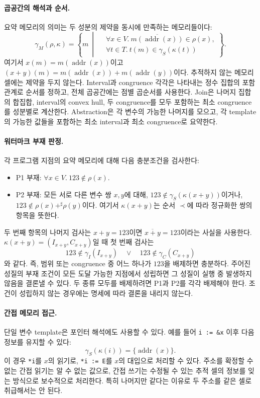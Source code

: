 \documentclass[a4paper,10pt]{article}
\newcommand{\addr}{\operatorname{addr}}
\newcommand{\remN}[1]{\overline{#1}}
\begin{document}
\paragraph{곱공간의 해석과 순서.}
요약 메모리의 의미는 두 성분의 제약을 동시에 만족하는 메모리들이다:
\[
 \gamma_M(\rho,\kappa)=
 \left\{m\ \middle|\
 \begin{aligned}
  &\forall x\in V.\ \remN{m(\addr(x))}\in\rho(x),\\
  &\forall t\in T.\ t(m)\in\gamma_S(\kappa(t))
 \end{aligned}
 \right\}.
\]
여기서 $x(m)=m(\addr(x))$이고
$(x+y)(m)=m(\addr(x))+m(\addr(y))$이다.
추적하지 않는 메모리 셀에는 제약을 두지 않는다.
Interval과 congruence 각각은 나타내는 정수 집합의 포함관계로 순서를 정하고,
전체 곱공간에는 점별 곱순서를 사용한다.
Join은 나머지 집합의 합집합, interval의 convex hull,
두 congruence를 모두 포함하는 최소 congruence를 성분별로 계산한다.
Abstraction은 각 변수의 가능한 나머지를 모으고,
각 template의 가능한 값들을 포함하는 최소 interval과 최소 congruence로 요약한다.

\paragraph{워터마크 부재 판정.}
각 프로그램 지점의 요약 메모리에 대해 다음 충분조건을 검사한다:
\begin{itemize}[leftmargin=*,itemsep=3pt]
 \item P1 부재:
 $\forall x\in V.\ 123\notin\rho(x)$.
 \item P2 부재: 모든 서로 다른 변수 쌍 $x,y$에 대해,
 $123\notin\gamma_S(\kappa(x+y))$이거나,
 $123\notin\rho(x)+^\sharp\rho(y)$이다.
 여기서 $\kappa(x+y)$는 순서 $\prec$에 따라 정규화한 쌍의 항목을 뜻한다.
\end{itemize}
두 번째 항목의 나머지 검사는 $x+y=123$이면
$\remN{x+y}=123$이라는 사실을 사용한다.
$\kappa(x+y)=(I_{x+y},C_{x+y})$일 때 첫 번째 검사는
\[
 123\notin\gamma_I(I_{x+y})
 \quad\lor\quad
 123\notin\gamma_C(C_{x+y})
\]
와 같다. 즉, 범위 또는 congruence 중 어느 하나가 $123$을 배제하면 충분하다.
주어진 성질의 부재 조건이 모든 도달 가능한 지점에서 성립하면
그 성질이 실행 중 발생하지 않음을 결론낼 수 있다.
두 종류 모두를 배제하려면 P1과 P2를 각각 배제해야 한다.
조건이 성립하지 않는 경우에는 명세에 따라 결론을 내리지 않는다.

\paragraph{간접 메모리 접근.}
단일 변수 template은 포인터 해석에도 사용할 수 있다.
예를 들어 \texttt{i := \&x} 이후 다음 정보를 유지할 수 있다:
\[
 \gamma_S(\kappa(i))=\{\addr(x)\}.
\]
이 경우 \texttt{*i}를 $x$의 읽기로,
\texttt{*i := E}를 $x$의 대입으로 처리할 수 있다.
주소를 확정할 수 없는 간접 읽기는 알 수 없는 값으로,
간접 쓰기는 수정될 수 있는 추적 셀의 정보를 잊는 방식으로 보수적으로 처리한다.
특히 나머지만 같다는 이유로 두 주소를 같은 셀로 취급해서는 안 된다.
\end{document}
